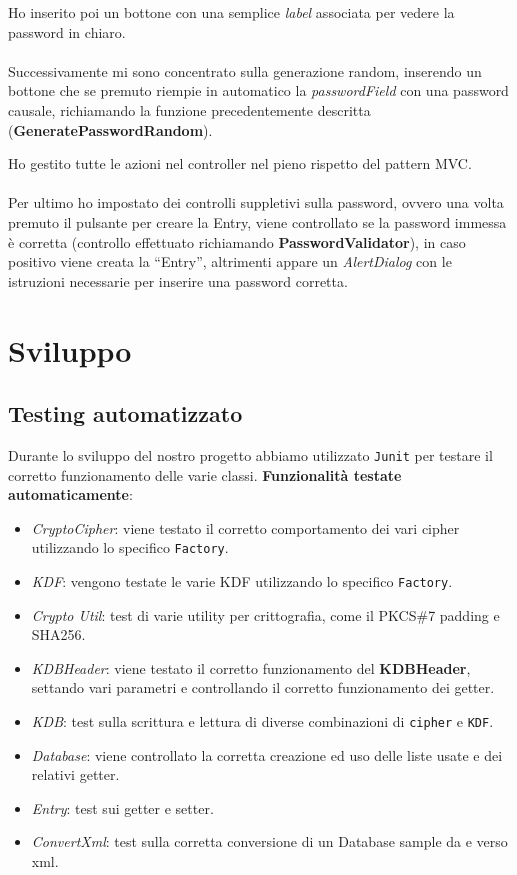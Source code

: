 \documentclass[a4paper,12pt]{report}
\begin{document}
Ho inserito poi un bottone con una semplice \textit{label} associata per vedere la password in chiaro.\\

\\Successivamente mi sono concentrato sulla generazione random, inserendo un bottone che se premuto riempie in automatico la \textit{passwordField} con una password causale, richiamando la funzione precedentemente descritta (\textbf{GeneratePasswordRandom}).

Ho gestito tutte le azioni nel controller nel pieno rispetto del pattern MVC.\\

\\Per ultimo ho impostato dei controlli suppletivi sulla password, ovvero una volta premuto il pulsante per creare la Entry, viene controllato se la password immessa è corretta (controllo effettuato richiamando \textbf{PasswordValidator}), in caso positivo viene creata la “Entry”, altrimenti appare un \textit{AlertDialog} con le istruzioni necessarie per inserire una password corretta.\\


\chapter{Sviluppo}
\section{Testing automatizzato}

Durante lo sviluppo del nostro progetto abbiamo utilizzato \texttt{Junit} per
testare il corretto funzionamento delle varie classi.
\textbf{Funzionalità testate automaticamente}:
\begin{itemize}
  \item \textit{CryptoCipher}: viene testato il corretto comportamento dei vari cipher utilizzando lo specifico \texttt{Factory}.
  \item \textit{KDF}: vengono testate le varie KDF utilizzando lo specifico \texttt{Factory}.
  \item \textit{Crypto Util}: test di varie utility per crittografia, come il PKCS\#7 padding e SHA256.
  \item \textit{KDBHeader}: viene testato il corretto funzionamento del \textbf{KDBHeader}, settando vari parametri e controllando il corretto funzionamento dei getter.
  \item \textit{KDB}: test sulla scrittura e lettura di diverse combinazioni di \texttt{cipher} e \texttt{KDF}.
  \item \textit{Database}: viene controllato la corretta creazione ed uso delle liste usate e dei relativi getter.
  \item \textit{Entry}: test sui getter e setter.
  \item \textit{ConvertXml}: test sulla corretta conversione di un Database sample da e verso xml.
\end{itemize}
\end{document}

